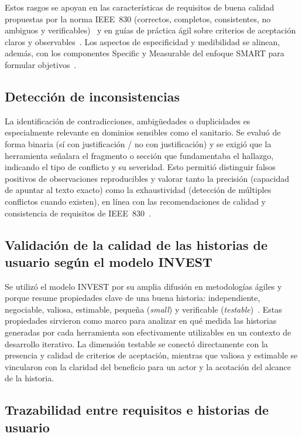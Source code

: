 Estos rasgos se apoyan en las características de requisitos de buena calidad propuestas por la norma IEEE~830 (correctos, completos, consistentes, no ambiguos y verificables)~\cite{ieee830} y en guías de práctica ágil sobre criterios de aceptación claros y observables~\cite{atlassian_acceptance_criteria,agile_business_requirements_user_stories}. Los aspectos de especificidad y medibilidad se alinean, además, con los componentes Specific y Measurable del enfoque SMART para formular objetivos~\cite{doran_smart}.

\subsection{Detección de inconsistencias}

La identificación de contradicciones, ambigüedades o duplicidades es especialmente relevante en dominios sensibles como el sanitario. Se evaluó de forma binaria (sí con justificación / no con justificación) y se exigió que la herramienta señalara el fragmento o sección que fundamentaba el hallazgo, indicando el tipo de conflicto y su severidad. Esto permitió distinguir falsos positivos de observaciones reproducibles y valorar tanto la precisión (capacidad de apuntar al texto exacto) como la exhaustividad (detección de múltiples conflictos cuando existen), en línea con las recomendaciones de calidad y consistencia de requisitos de IEEE~830~\cite{ieee830}.

\subsection{Validación de la calidad de las historias de usuario según el modelo INVEST}

Se utilizó el modelo INVEST por su amplia difusión en metodologías ágiles y porque resume propiedades clave de una buena historia: independiente, negociable, valiosa, estimable, pequeña (\textit{small}) y verificable (\textit{testable})~\cite{wake_invest,cohn_user_stories_applied}. Estas propiedades sirvieron como marco para analizar en qué medida las historias generadas por cada herramienta son efectivamente utilizables en un contexto de desarrollo iterativo. La dimensión testable se conectó directamente con la presencia y calidad de criterios de aceptación, mientras que valiosa y estimable se vincularon con la claridad del beneficio para un actor y la acotación del alcance de la historia.

\subsection{Trazabilidad entre requisitos e historias de usuario}

